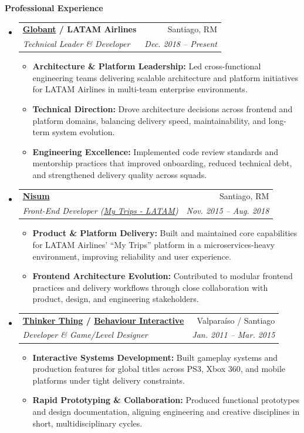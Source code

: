 \documentclass[letterpaper,11pt]{article}
\makeatletter
\newcommand{\resitem}[1]{\item #1 \vspace{-2pt}}
\newcommand{\resheading}[1]{{\large \colorbox{mygrey}{\begin{minipage}{\textwidth}{\textbf{#1 \vphantom{p\^{E}}}}\end{minipage}}}}
\newcommand{\ressubheading}[4]{
    \begin{tabular*}{6.5in}{l@{\extracolsep{\fill}}r}
            \textbf{#1} & #2 \\
            \textit{#3} & \textit{#4} \\
    \end{tabular*}\vspace{-6pt}}
\makeatother
\begin{document}
    \resheading{Professional Experience}
        \begin{itemize}
            \item 
                \ressubheading{\href{https://www.globant.com/}{Globant} / LATAM Airlines}{Santiago, RM}{Technical Leader \& Developer}{Dec. 2018 -- Present}
                    { \footnotesize
                    \begin{itemize}
                        \resitem{\textbf{Architecture \& Platform Leadership:} Led cross-functional engineering teams delivering scalable architecture and platform initiatives for LATAM Airlines in multi-team enterprise environments.}
                        \resitem{\textbf{Technical Direction:} Drove architecture decisions across frontend and platform domains, balancing delivery speed, maintainability, and long-term system evolution.}
                        \resitem{\textbf{Engineering Excellence:} Implemented code review standards and mentorship practices that improved onboarding, reduced technical debt, and strengthened delivery quality across squads.}
                    \end{itemize}
                    }
            \item 
                \ressubheading{\href{http://www.nisumlatam.com/}{Nisum}}{Santiago, RM}{Front-End Developer (\href{https://www.latam.com/es_cl/apps/personas/mybookings}{My Trips - LATAM})}{Nov. 2015 -- Aug. 2018}
                    { \footnotesize
                    \begin{itemize}
                        \resitem{\textbf{Product \& Platform Delivery:} Built and maintained core capabilities for LATAM Airlines' ``My Trips'' platform in a microservices-heavy environment, improving reliability and user experience.}
                        \resitem{\textbf{Frontend Architecture Evolution:} Contributed to modular frontend practices and delivery workflows through close collaboration with product, design, and engineering stakeholders.}
                    \end{itemize}
                    }
            \item 
                \ressubheading{\href{http://thinkerthing.com/}{Thinker Thing} / \href{https://www.bhvr.com/}{Behaviour Interactive}}{Valparaíso / Santiago}{Developer \& Game/Level Designer}{Jan. 2011 -- Mar. 2015}
                    { \footnotesize
                    \begin{itemize}
                        \resitem{\textbf{Interactive Systems Development:} Built gameplay systems and production features for global titles across PS3, Xbox 360, and mobile platforms under tight delivery constraints.}
                        \resitem{\textbf{Rapid Prototyping \& Collaboration:} Produced functional prototypes and design documentation, aligning engineering and creative disciplines in short, multidisciplinary cycles.}
                    \end{itemize}
                    }
        \end{itemize}  %
    
\end{document}
